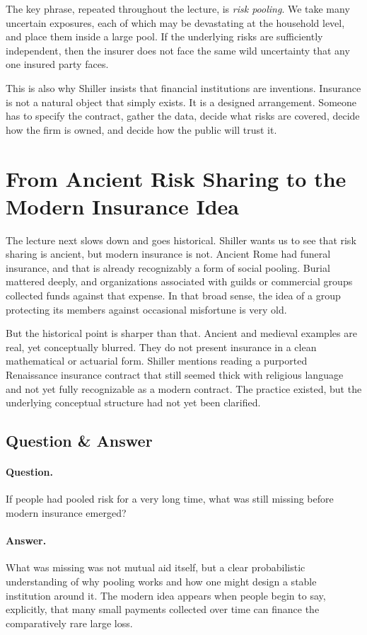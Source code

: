 The key phrase, repeated throughout the lecture, is \emph{risk pooling}. We take many uncertain exposures, each of which may be devastating at the household level, and place them inside a large pool. If the underlying risks are sufficiently independent, then the insurer does not face the same wild uncertainty that any one insured party faces.

This is also why Shiller insists that financial institutions are inventions. Insurance is not a natural object that simply exists. It is a designed arrangement. Someone has to specify the contract, gather the data, decide what risks are covered, decide how the firm is owned, and decide how the public will trust it.

\section{From Ancient Risk Sharing to the Modern Insurance Idea}

The lecture next slows down and goes historical. Shiller wants us to see that risk sharing is ancient, but modern insurance is not. Ancient Rome had funeral insurance, and that is already recognizably a form of social pooling. Burial mattered deeply, and organizations associated with guilds or commercial groups collected funds against that expense. In that broad sense, the idea of a group protecting its members against occasional misfortune is very old.

But the historical point is sharper than that. Ancient and medieval examples are real, yet conceptually blurred. They do not present insurance in a clean mathematical or actuarial form. Shiller mentions reading a purported Renaissance insurance contract that still seemed thick with religious language and not yet fully recognizable as a modern contract. The practice existed, but the underlying conceptual structure had not yet been clarified.

\subsection{Question \& Answer}

\paragraph{Question.} If people had pooled risk for a very long time, what was still missing before modern insurance emerged?

\paragraph{Answer.} What was missing was not mutual aid itself, but a clear probabilistic understanding of why pooling works and how one might design a stable institution around it. The modern idea appears when people begin to say, explicitly, that many small payments collected over time can finance the comparatively rare large loss.

